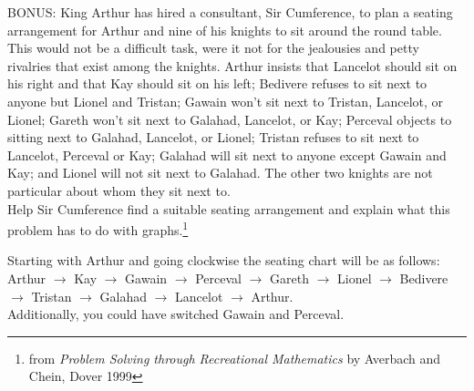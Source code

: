 \begin{questions}
\begin{parts}
\end{parts}

\question BONUS: King Arthur has hired a consultant, Sir Cumference, to plan a seating arrangement for Arthur and nine of his knights to sit around the round table. This would not be a difficult task, were it not for the jealousies and petty rivalries that exist among the knights. Arthur insists that Lancelot should sit on his right and that Kay should sit on his left; Bedivere refuses to sit next to anyone but Lionel and Tristan; Gawain won't sit next to Tristan, Lancelot, or Lionel; Gareth won't sit next to Galahad, Lancelot, or Kay; Perceval objects to sitting next to Galahad, Lancelot, or Lionel; Tristan refuses to sit next to Lancelot, Perceval or Kay; Galahad will sit next to anyone except Gawain and Kay; and Lionel will not sit next to Galahad. The other two knights are not particular about whom they sit next to. \\
Help Sir Cumference find a suitable seating arrangement and explain what this problem has to do with graphs.\footnote{from \emph{Problem Solving through Recreational Mathematics} by Averbach and Chein, Dover 1999}
\begin{solution}
Starting with Arthur and going clockwise the seating chart will be as follows: Arthur $\rightarrow$ Kay $\rightarrow$ Gawain $\rightarrow$ Perceval $\rightarrow$ Gareth $\rightarrow$ Lionel $\rightarrow$ Bedivere $\rightarrow$ Tristan $\rightarrow$ Galahad $\rightarrow$ Lancelot $\rightarrow$ Arthur.\\
Additionally, you could have switched Gawain and Perceval.
\end{solution}







 
\end{questions}


